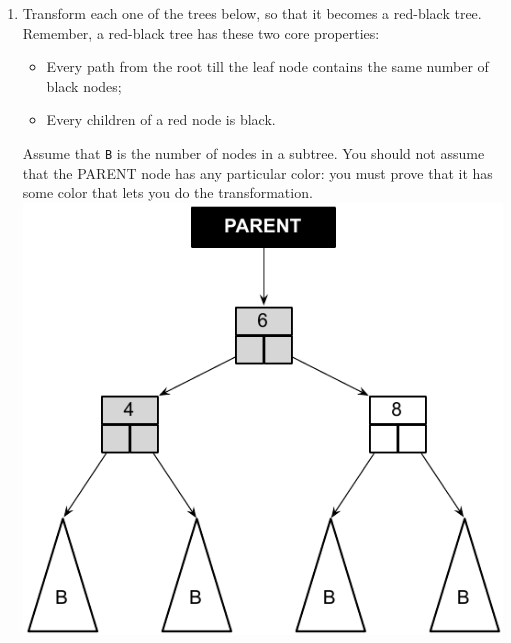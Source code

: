 \documentclass[12pt]{article}
\begin{document}
\begin{enumerate}
\newpage

\item Transform each one of the trees below, so that it becomes a red-black
tree.
Remember, a red-black tree has these two core properties:

\begin{itemize}
\item Every path from the root till the leaf node contains the same number of
black nodes;
\item Every children of a red node is black.
\end{itemize}

Assume that \texttt{B} is the number of nodes in a subtree.
You should not assume that the PARENT node has any particular color: you must
prove that it has some color that lets you do the transformation. \\

\includegraphics[scale=0.7]{images/RBT_1}

\vspace{2cm}


\end{enumerate}
\end{document}
